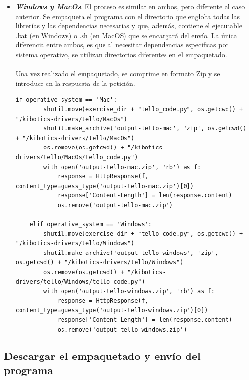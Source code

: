 \documentclass{report}
\begin{document}
\begin{itemize}
	\item \textit{\textbf{Windows y MacOs}}. El proceso es similar en ambos, pero diferente al caso anterior. Se empaqueta el programa con el directorio que engloba todas las librerías y las dependencias necesarias y que, además, contiene el ejecutable .bat (en Windows) o .sh (en MacOS) que se encargará del envío. La única diferencia entre ambos, es que al necesitar dependencias especificas por sistema operativo, se utilizan directorios diferentes en el empaquetado.
	\\
	\\
	Una vez realizado el empaquetado, se comprime en formato Zip y se introduce en la respuesta de la petición.
	\\
\begin{lstlisting}[frame=single,breaklines=true, label="Creación empaquetado y respuesta en Windows y MacOs", caption="Creación empaquetado y respuesta en Windows y MacOs",  captionpos=b]
   if operative_system == 'Mac':
        shutil.move(exercise_dir + "tello_code.py", os.getcwd() + "/kibotics-drivers/tello/MacOs")
        shutil.make_archive('output-tello-mac', 'zip', os.getcwd() + "/kibotics-drivers/tello/MacOs")
        os.remove(os.getcwd() + "/kibotics-drivers/tello/MacOs/tello_code.py")
        with open('output-tello-mac.zip', 'rb') as f:
            response = HttpResponse(f, content_type=guess_type('output-tello-mac.zip')[0])
            response['Content-Length'] = len(response.content)
            os.remove('output-tello-mac.zip')

    elif operative_system == 'Windows':
        shutil.move(exercise_dir + "tello_code.py", os.getcwd() + "/kibotics-drivers/tello/Windows")
        shutil.make_archive('output-tello-windows', 'zip', os.getcwd() + "/kibotics-drivers/tello/Windows")
        os.remove(os.getcwd() + "/kibotics-drivers/tello/Windows/tello_code.py")
        with open('output-tello-windows.zip', 'rb') as f:
            response = HttpResponse(f, content_type=guess_type('output-tello-windows.zip')[0])
            response['Content-Length'] = len(response.content)
            os.remove('output-tello-windows.zip')
\end{lstlisting}	

\end{itemize}

\subsection{Descargar el empaquetado y envío del programa}
\end{document}
